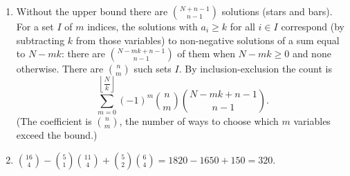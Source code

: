 \begin{enumerate}
\item Without the upper bound there are $\binom{N+n-1}{n-1}$ solutions (stars and bars). For a set $I$ of $m$ indices, the solutions with $a_i\ge k$ for all $i\in I$ correspond (by subtracting $k$ from those variables) to non-negative solutions of a sum equal to $N-mk$: there are $\binom{N-mk+n-1}{n-1}$ of them when $N-mk\ge0$ and none otherwise. There are $\binom nm$ such sets $I$. By inclusion-exclusion the count is
\[\boxed{\sum_{m=0}^{\left\lfloor \dfrac{N}{k}\right\rfloor}(-1)^m\binom nm\binom{N-mk+n-1}{n-1}}.\]
(The coefficient is $\binom nm$, the number of ways to choose which $m$ variables exceed the bound.)
\item $\binom{16}4-\binom51\binom{11}4+\binom52\binom64=1820-1650+150=\boxed{320}$.
\end{enumerate}
